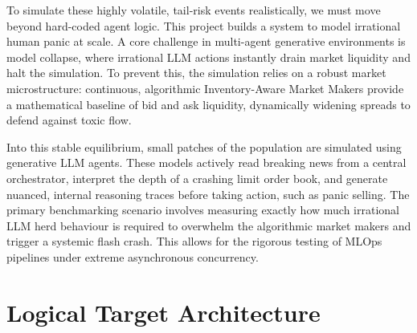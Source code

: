 \documentclass[10pt,a4paper]{article}
\begin{document}
To simulate these highly volatile, tail-risk events realistically, we must move beyond hard-coded agent logic. This project builds a system to model irrational human panic at scale. A core challenge in multi-agent generative environments is model collapse, where irrational LLM actions instantly drain market liquidity and halt the simulation. To prevent this, the simulation relies on a robust market microstructure: continuous, algorithmic Inventory-Aware Market Makers provide a mathematical baseline of bid and ask liquidity, dynamically widening spreads to defend against toxic flow.

Into this stable equilibrium, small patches of the population are simulated using generative LLM agents. These models actively read breaking news from a central orchestrator, interpret the depth of a crashing limit order book, and generate nuanced, internal reasoning traces before taking action, such as panic selling. The primary benchmarking scenario involves measuring exactly how much irrational LLM herd behaviour is required to overwhelm the algorithmic market makers and trigger a systemic flash crash. This allows for the rigorous testing of MLOps pipelines under extreme asynchronous concurrency.

\section{Logical Target Architecture}
\end{document}
